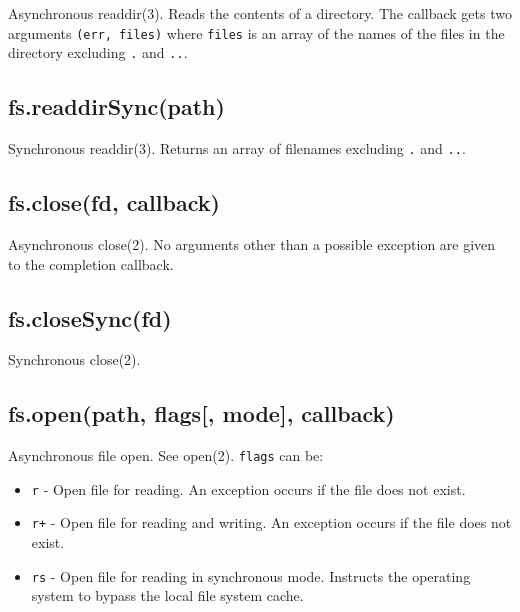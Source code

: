 Asynchronous readdir(3). Reads the contents of a directory. The callback
gets two arguments \texttt{(err,\ files)} where \texttt{files} is an
array of the names of the files in the directory excluding
\texttt{\textquotesingle{}.\textquotesingle{}} and
\texttt{\textquotesingle{}..\textquotesingle{}}.

\subsection{fs.readdirSync(path)}\label{fs.readdirsyncpath}

Synchronous readdir(3). Returns an array of filenames excluding
\texttt{\textquotesingle{}.\textquotesingle{}} and
\texttt{\textquotesingle{}..\textquotesingle{}}.

\subsection{fs.close(fd, callback)}\label{fs.closefd-callback}

Asynchronous close(2). No arguments other than a possible exception are
given to the completion callback.

\subsection{fs.closeSync(fd)}\label{fs.closesyncfd}

Synchronous close(2).

\subsection{fs.open(path, flags{[}, mode{]},
callback)}\label{fs.openpath-flags-mode-callback}

Asynchronous file open. See open(2). \texttt{flags} can be:

\begin{itemize}
\item
  \texttt{\textquotesingle{}r\textquotesingle{}} - Open file for
  reading. An exception occurs if the file does not exist.
\item
  \texttt{\textquotesingle{}r+\textquotesingle{}} - Open file for
  reading and writing. An exception occurs if the file does not exist.
\item
  \texttt{\textquotesingle{}rs\textquotesingle{}} - Open file for
  reading in synchronous mode. Instructs the operating system to bypass
  the local file system cache.
\end{itemize}

